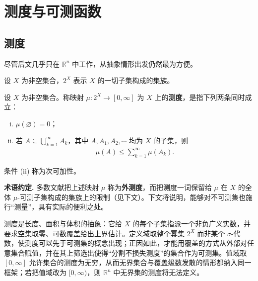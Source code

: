 \documentclass[../../main.tex]{subfiles}
\begin{document}
\section{测度与可测函数}\label{section:ch01-01}

\subsection{测度}\label{subsection:ch01-01-测度}

尽管后文几乎只在 $\mathbb{R}^n$ 中工作，从抽象情形出发仍然最为方便。

设 $X$ 为非空集合，$2^X$ 表示 $X$ 的一切子集构成的集族。

\begin{definition}[测度]\label{definition:ch01-1-1}
设 $X$ 为非空集合。称映射 $\mu:2^{X}\to[0,\infty]$ 为 $X$ 上的\textbf{测度}，是指下列两条同时成立：
\begin{enumerate}[(i)]
\item $\mu(\varnothing)=0$；
\item 若 $A\subseteq\bigcup_{k=1}^{\infty}A_{k}$，其中 $A,A_{1},A_{2},\cdots$ 均为 $X$ 的子集，则
\begin{align*}
\mu(A)\leqslant\sum_{k=1}^{\infty}\mu(A_{k}).
\end{align*}
\end{enumerate}
\end{definition}

条件 (ii) 称为次可加性。

\begin{remark}\label{remark:ch01-def-1-1-约定}
\textbf{术语约定.} 多数文献把上述映射 $\mu$ 称为\textbf{外测度}，而把测度一词保留给 $\mu$ 在 $X$ 的全体 $\mu$-可测子集构成的集族上的限制（见下文）。下文将说明，能够对不可测集也施行“测量”，具有实际的便利之处。
\end{remark}

\begin{remark}\label{remark:ch01-def-1-1-测度动机}
测度是长度、面积与体积的抽象：它给 $X$ 的每个子集指派一个非负广义实数，并要求空集取零、可数覆盖给出上界估计。定义域取整个幂集 $2^X$ 而非某个 $\sigma$-代数，使测度可以先于可测集的概念出现；正因如此，才能用覆盖的方式从外部对任意集合赋值，并在其上筛选出使得“分割不损失测度”的集合作为可测集。值域取 $[0,\infty]$ 允许集合的测度为无穷，从而无界集合与覆盖级数发散的情形都纳入同一框架；若把值域改为 $[0,\infty)$，则 $\mathbb{R}^n$ 中无界集的测度将无法定义。
\end{remark}
\end{document}
